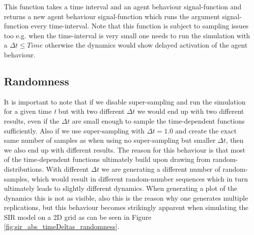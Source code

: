 This function takes a time interval and an agent behaviour signal-function and returns a new agent behaviour signal-function which runs the argument signal-function every time-interval. Note that this function is subject to sampling issues too e.g. when the time-interval is very small one needs to run the simulation with a $\Delta t \leq Time$ otherwise the dynamics would show delayed activation of the agent behaviour.

\subsection{Randomness}
It is important to note that if we disable super-sampling and run the simulation for a given time \textit{t} but with two different $\Delta t$ we would end up with two different results, even if the $\Delta t$ are small enough to sample the time-dependent functions sufficiently. Also if we use super-sampling with $\Delta t = 1.0$ and create the exact same number of samples as when using no super-sampling but smaller $\Delta t$, then we also end up with different results.
The reason for this behaviour is that most of the time-dependent functions ultimately build upon drawing from random-distributions. With different $\Delta t$ we are generating a different number of random-samples, which would result in different random-number sequences which in turn ultimately leads to slightly different dynamics. When generating a plot of the dynamics this is not as visible, also this is the reason why one generates multiple replications, but this behaviour becomes strikingly apparent when simulating the SIR model on a 2D grid as can be seen in Figure \ref{fig:sir_abs_timeDeltas_randomness}.

